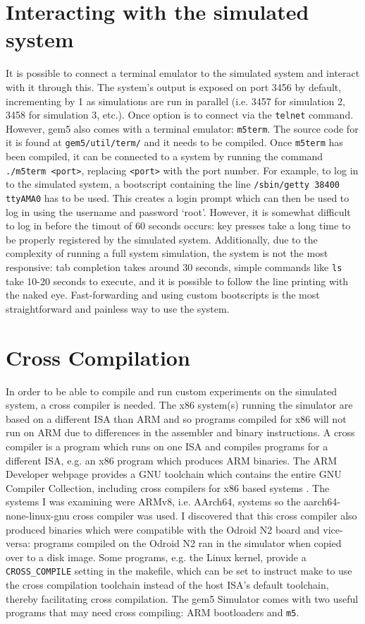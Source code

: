 \section{Interacting with the simulated system}
It is possible to connect a terminal emulator to the simulated system and 
interact with it through this. The system's output is exposed on port 3456 by 
default, incrementing by 1 as simulations are run in parallel (i.e. 3457 for 
simulation 2, 3458 for simulation 3, etc.). Once option is to connect via the 
\texttt{telnet} command. However, gem5 also comes with a terminal emulator: 
\texttt{m5term}. The source code for it is found at \texttt{gem5/util/term/} 
and it needs to be compiled. Once \texttt{m5term} has been compiled, it can be 
connected to a system by running the command \texttt{./m5term <port>}, 
replacing \texttt{<port>} with the port number. For example, to log in to the 
simulated system, a bootscript containing the line \texttt{/sbin/getty 38400 
ttyAMA0} has to be used. This creates a login prompt which can then be used to 
log in using the username and password `root'. However, it is somewhat 
difficult to log in before the timout of 60 seconds occurs: key presses take a 
long time to be properly registered by the simulated system. Additionally, due 
to the complexity of running a full system simulation, the system is not the 
most responsive: tab completion takes around 30 seconds, simple commands like
\texttt{ls} take 10-20 seconds to execute, and it is possible to follow the 
line printing with the naked eye. Fast-forwarding and using custom bootscripts 
is the most straightforward and painless way to use the system.

\section{Cross Compilation}
In order to be able to compile and run custom experiments on the simulated 
system, a cross compiler is needed. The x86 system(s) running the simulator are 
based on a different ISA than ARM and so programs compiled for x86 will not run 
on ARM due to differences in the assembler and binary instructions. A cross 
compiler is a program which runs on one ISA and compiles programs for a 
different ISA, e.g. an x86 program which produces ARM binaries. The ARM 
Developer webpage provides a GNU toolchain which contains the entire GNU 
Compiler Collection, including cross compilers for x86 based systems 
\cite{noauthor_gnu_2019}. The systems I was examining were ARMv8, i.e. AArch64, 
systems so the {\sffamily aarch64-none-linux-gnu} cross compiler was used. I 
discovered that this cross compiler also produced binaries which were 
compatible with the Odroid N2 board and vice-versa: programs compiled on the 
Odroid N2 ran in the simulator when copied over to a disk image. Some programs, 
e.g. the Linux kernel, provide a \texttt{CROSS\_COMPILE} setting in the 
makefile, which can be set to instruct make to use the cross compilation 
toolchain instead of the host ISA's default toolchain, thereby facilitating 
cross compilation. The gem5 Simulator comes with two useful programs that may 
need cross compiling: ARM bootloaders and \texttt{m5}.


